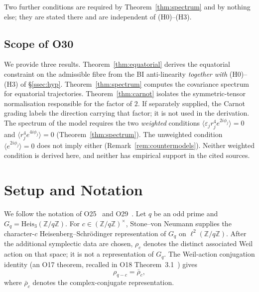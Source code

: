 \documentclass[11pt,a4paper]{article}
\begin{document}
    Two further conditions are required by Theorem~\ref{thm:spectrum} and by nothing else; they are
    stated there and are independent of (H0)--(H3).

  \subsection{Scope of O30}

    We provide three results.
    Theorem~\ref{thm:equatorial} derives the equatorial constraint on the admissible fibre from the
    BI anti-linearity \emph{together with} (H0)--(H3) of \S\ref{ssec:hyp}.
    Theorem~\ref{thm:spectrum} computes the covariance spectrum for equatorial trajectories.
    Theorem~\ref{thm:carnot} isolates the symmetric-tensor normalisation responsible for the factor
    of $2$.
    If separately supplied, the Carnot grading labels the direction carrying that factor; it is not
    used in the derivation.
    The spectrum of the model requires the two \emph{weighted} conditions
    $\langle \varepsilon_j r_j^4 e^{2i\phi_j}\rangle = 0$ and
    $\langle r_j^4 e^{4i\phi_j}\rangle = 0$ (Theorem~\ref{thm:spectrum}).
    The unweighted condition $\langle e^{2i\phi_j}\rangle = 0$ does not imply either
    (Remark~\ref{rem:countermodels}).
    Neither weighted condition is derived here, and neither has empirical support in the cited
    sources.

  \section{Setup and Notation}
  \label{sec:setup}

  We follow the notation of O25~\cite{Beau2026a29} and O29~\cite{Beau2026a33}.
  Let $q$ be an odd prime and $G_q = \mathrm{Heis}_3(\mathbb{Z}/q\mathbb{Z})$.
  For $c \in (\mathbb{Z}/q\mathbb{Z})^\times$, Stone--von Neumann supplies the character-$c$
  Heisenberg--Schr\"odinger representation of $G_q$ on $\ell^2(\mathbb{Z}/q\mathbb{Z})$.
  After the additional symplectic data are chosen, $\rho_c$ denotes the distinct associated Weil
  action on that space; it is not a representation of $G_q$.
  The Weil-action conjugation identity (an O17 theorem, recalled in O18
  Theorem~3.1~\cite{Beau2026a22})
  gives
  \begin{equation}
    \label{eq:biparity}
    \rho_{q-c} = \bar{\rho}_c,
  \end{equation}
  where $\bar{\rho}_c$ denotes the complex-conjugate representation.
\end{document}
